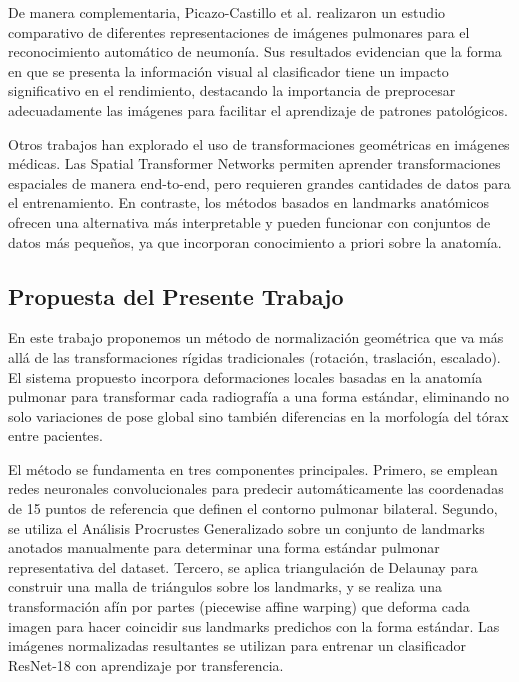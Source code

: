 \documentclass[runningheads]{llncs}
\begin{document}
De manera complementaria, Picazo-Castillo et al. \cite{picazo2024comparative} realizaron un estudio comparativo de diferentes representaciones de imágenes pulmonares para el reconocimiento automático de neumonía. Sus resultados evidencian que la forma en que se presenta la información visual al clasificador tiene un impacto significativo en el rendimiento, destacando la importancia de preprocesar adecuadamente las imágenes para facilitar el aprendizaje de patrones patológicos.

Otros trabajos han explorado el uso de transformaciones geométricas en imágenes médicas. Las Spatial Transformer Networks \cite{jaderberg2015spatial} permiten aprender transformaciones espaciales de manera end-to-end, pero requieren grandes cantidades de datos para el entrenamiento. En contraste, los métodos basados en landmarks anatómicos ofrecen una alternativa más interpretable y pueden funcionar con conjuntos de datos más pequeños, ya que incorporan conocimiento a priori sobre la anatomía.

\subsection{Propuesta del Presente Trabajo}

En este trabajo proponemos un método de normalización geométrica que va más allá de las transformaciones rígidas tradicionales (rotación, traslación, escalado). El sistema propuesto incorpora deformaciones locales basadas en la anatomía pulmonar para transformar cada radiografía a una forma estándar, eliminando no solo variaciones de pose global sino también diferencias en la morfología del tórax entre pacientes.

El método se fundamenta en tres componentes principales. Primero, se emplean redes neuronales convolucionales para predecir automáticamente las coordenadas de 15 puntos de referencia que definen el contorno pulmonar bilateral. Segundo, se utiliza el Análisis Procrustes Generalizado \cite{gower1975generalized} sobre un conjunto de landmarks anotados manualmente para determinar una forma estándar pulmonar representativa del dataset. Tercero, se aplica triangulación de Delaunay \cite{delaunay1934sphere} para construir una malla de triángulos sobre los landmarks, y se realiza una transformación afín por partes (piecewise affine warping) \cite{wolberg1990digital} que deforma cada imagen para hacer coincidir sus landmarks predichos con la forma estándar. Las imágenes normalizadas resultantes se utilizan para entrenar un clasificador ResNet-18 \cite{he2016deep} con aprendizaje por transferencia.
\end{document}
